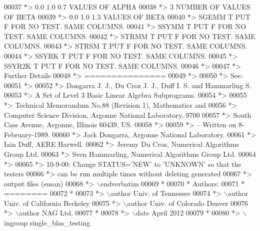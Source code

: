 \begin{DoxyCode}
00037 \textcolor{comment}{*> 0.0 1.0 0.7       VALUES OF ALPHA}
00038 \textcolor{comment}{*> 3                 NUMBER OF VALUES OF BETA}
00039 \textcolor{comment}{*> 0.0 1.0 1.3       VALUES OF BETA}
00040 \textcolor{comment}{*> SGEMM  T PUT F FOR NO TEST. SAME COLUMNS.}
00041 \textcolor{comment}{*> SSYMM  T PUT F FOR NO TEST. SAME COLUMNS.}
00042 \textcolor{comment}{*> STRMM  T PUT F FOR NO TEST. SAME COLUMNS.}
00043 \textcolor{comment}{*> STRSM  T PUT F FOR NO TEST. SAME COLUMNS.}
00044 \textcolor{comment}{*> SSYRK  T PUT F FOR NO TEST. SAME COLUMNS.}
00045 \textcolor{comment}{*> SSYR2K T PUT F FOR NO TEST. SAME COLUMNS.}
00046 \textcolor{comment}{*>}
00047 \textcolor{comment}{*> Further Details}
00048 \textcolor{comment}{*> ===============}
00049 \textcolor{comment}{*>}
00050 \textcolor{comment}{*> See:}
00051 \textcolor{comment}{*>}
00052 \textcolor{comment}{*>    Dongarra J. J., Du Croz J. J., Duff I. S. and Hammarling S.}
00053 \textcolor{comment}{*>    A Set of Level 3 Basic Linear Algebra Subprograms.}
00054 \textcolor{comment}{*>}
00055 \textcolor{comment}{*>    Technical Memorandum No.88 (Revision 1), Mathematics and}
00056 \textcolor{comment}{*>    Computer Science Division, Argonne National Laboratory, 9700}
00057 \textcolor{comment}{*>    South Cass Avenue, Argonne, Illinois 60439, US.}
00058 \textcolor{comment}{*>}
00059 \textcolor{comment}{*> -- Written on 8-February-1989.}
00060 \textcolor{comment}{*>    Jack Dongarra, Argonne National Laboratory.}
00061 \textcolor{comment}{*>    Iain Duff, AERE Harwell.}
00062 \textcolor{comment}{*>    Jeremy Du Croz, Numerical Algorithms Group Ltd.}
00063 \textcolor{comment}{*>    Sven Hammarling, Numerical Algorithms Group Ltd.}
00064 \textcolor{comment}{*>}
00065 \textcolor{comment}{*>    10-9-00:  Change STATUS='NEW' to 'UNKNOWN' so that the testers}
00066 \textcolor{comment}{*>              can be run multiple times without deleting generated}
00067 \textcolor{comment}{*>              output files (susan)}
00068 \textcolor{comment}{*> \(\backslash\)endverbatim}
00069 \textcolor{comment}{*}
00070 \textcolor{comment}{*  Authors:}
00071 \textcolor{comment}{*  ========}
00072 \textcolor{comment}{*}
00073 \textcolor{comment}{*> \(\backslash\)author Univ. of Tennessee }
00074 \textcolor{comment}{*> \(\backslash\)author Univ. of California Berkeley }
00075 \textcolor{comment}{*> \(\backslash\)author Univ. of Colorado Denver }
00076 \textcolor{comment}{*> \(\backslash\)author NAG Ltd. }
00077 \textcolor{comment}{*}
00078 \textcolor{comment}{*> \(\backslash\)date April 2012}
00079 \textcolor{comment}{*}
00080 \textcolor{comment}{*> \(\backslash\)ingroup single\_blas\_testing}

\end{DoxyCode}
